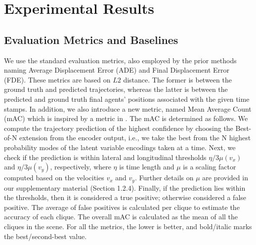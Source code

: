 \documentclass{article}
\begin{document}
\section{Experimental Results}
\vspace{-10pt}
\subsection{Evaluation Metrics and Baselines} 
We use the standard evaluation metrics, also employed by the prior methods \cite{chen2022scept, salzmann2021trajectron, agentformer, laformer} naming Average Displacement Error (ADE) and Final Displacement Error (FDE). These metrics are based on $L2$ distance. The former is between the ground truth and predicted trajectories, whereas the latter is between the predicted and ground truth final agents' positions associated with the given time stamps. In addition, we also introduce a new metric, named Mean Average Count (mAC) which is inspired by a metric in \cite{waymo}. The mAC is determined as follows. We compute the trajectory prediction of the highest confidence by choosing the Best-of-N extension from the encoder output, i.e., we take the best from the N highest probability modes of the latent variable encodings taken at a time. Next, we check if the prediction is within lateral and longitudinal thresholds $\eta/3\mu(v_x)$ and $\eta/3\mu(v_y)$, respectively, where $\eta$ is time length and $\mu$ is a scaling factor computed based on the velocities $v_x$ and $v_y$. Further details on $\mu$ are provided in our supplementary material (Section 1.2.4). Finally, if the prediction lies within the thresholds, then it is considered a true positive; otherwise considered a false positive. The average of false positives is calculated per clique to estimate the accuracy of each clique. The overall mAC is calculated as the mean of all the cliques in the scene. For all the metrics, the lower is better, and bold/italic marks the best/second-best value. 
\end{document}
